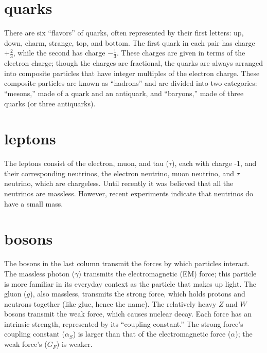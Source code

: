 \section{quarks}
There are six ``flavors'' of quarks, 
often represented by their first letters: 
up, down, charm, strange, top, and bottom.  
The first quark in each pair has charge $+\frac{2}{3}$, 
while the second has charge $-\frac{1}{3}$.  
These charges are given in terms of the electron charge; 
though the charges are fractional, 
the quarks are always arranged into composite 
particles that have integer multiples of the electron charge.  
These composite particles are known as ``hadrons'' 
and are divided into two categories: 
``mesons,'' made of a quark and an antiquark, 
and ``baryons,'' made of three quarks 
(or three antiquarks).  

\section{leptons}
The leptons consist of the electron, muon, and tau ($\tau$), 
each with charge -1, 
and their corresponding neutrinos, 
the electron neutrino, muon neutrino, and $\tau$ neutrino, 
which are chargeless.  
Until recently it was believed that all the neutrinos are massless.  
However, recent experiments indicate 
that neutrinos do have a small mass.  %

\section{bosons}
The bosons in the last column transmit the forces 
by which particles interact.  
The massless photon ($\gamma$) transmits the 
electromagnetic (EM) force; 
this particle is more familiar in its 
everyday context as the particle that makes up light.  
The gluon ($g$), also massless, transmits the strong force, 
which holds protons and neutrons together     %
(like glue, hence the name).  
The relatively heavy $Z$ and $W$ bosons 
transmit the weak force, 
which causes nuclear decay.  
Each force has an intrinsic strength, %
represented by its ``coupling constant.''  
The strong force's coupling constant ($\alpha_S$)
is larger than that 
of the electromagnetic force ($\alpha$); 
the weak force's ($G_F$) is weaker.  

